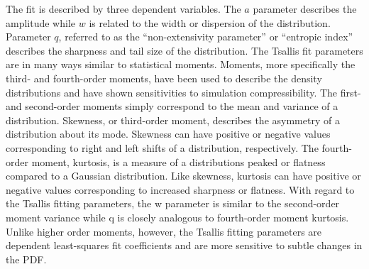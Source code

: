 \documentclass[a4paper,10pt]{article}
\begin{document}
{\noindent}The fit is described by three dependent variables. The $a$ parameter describes the amplitude while $w$ is related to the width or dispersion of the distribution. Parameter $q$, referred to as the ``non-extensivity parameter'' or ``entropic index'' describes the sharpness and tail size of the distribution. The Tsallis fit parameters are in many ways similar to statistical moments. Moments, more specifically the third- and fourth-order moments, have been used to describe the density distributions and have shown sensitivities to simulation compressibility. The first- and second-order moments simply correspond to the mean and variance of a distribution. Skewness, or third-order moment, describes the asymmetry of a distribution about its mode. Skewness can have positive or negative values corresponding to right and left shifts of a distribution, respectively. The fourth-order moment, kurtosis, is a measure of a distributions peaked or flatness compared to a Gaussian distribution. Like skewness, kurtosis can have positive or negative values corresponding to increased sharpness or flatness. With regard to the Tsallis fitting parameters, the w parameter is similar to the second-order moment variance while q is closely analogous to fourth-order moment kurtosis. Unlike higher order moments, however, the Tsallis fitting parameters are dependent least-squares fit coefficients and are more sensitive to subtle changes in the PDF.
\end{document}
